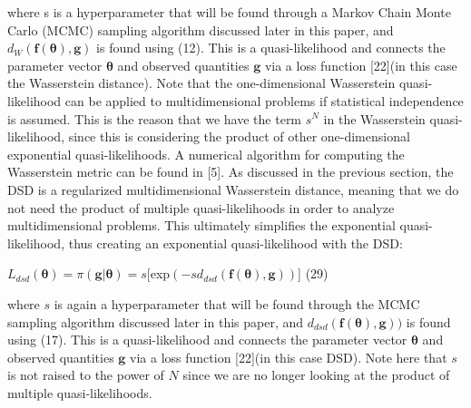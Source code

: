 \documentclass[botnum, fleqn]{unmeethesis}
\begin{document}
where s is a hyperparameter that will be found through a Markov Chain Monte Carlo (MCMC) sampling algorithm discussed later in this paper, and $d_W(\bm{f}(\bm{\theta}),\bm{g})$ is found using (12). This is a quasi-likelihood and connects the parameter vector $\bm{\theta}$ and observed quantities $\bm{g}$ via a loss function [22](in this case the Wasserstein distance). Note that the one-dimensional Wasserstein quasi-likelihood can be applied to multidimensional problems if statistical independence is assumed. This is the reason that we have the term $s^N$ in the Wasserstein quasi-likelihood, since this is considering the product of other one-dimensional exponential quasi-likelihoods. A numerical algorithm for computing the Wasserstein metric can be found in [5]. As discussed in the previous section, the DSD is a regularized multidimensional Wasserstein distance, meaning that we do not need the product of multiple quasi-likelihoods in order to analyze multidimensional problems. This ultimately simplifies the exponential quasi-likelihood, thus creating an exponential quasi-likelihood with the DSD:

\hspace{\fill}$L_{dsd}(\bm{\theta})=\pi(\bm{g}|\bm{\theta})=s$[exp$(-sd_{dsd}(\bm{f}(\bm{\theta}),\bm{g}))$]\hspace{\fill} \normalsize (29)

where $s$ is again a hyperparameter that will be found through the MCMC sampling algorithm discussed later in this paper, and $d_{dsd}(\bm{f}(\bm{\theta}),\bm{g}))$ is found using (17). This is a quasi-likelihood and connects the parameter vector $\bm{\theta}$ and observed quantities $\bm{g}$ via a loss function [22](in this case DSD). Note here that $s$ is not raised to the power of $N$ since we are no longer looking at the product of multiple quasi-likelihoods.
\end{document}
